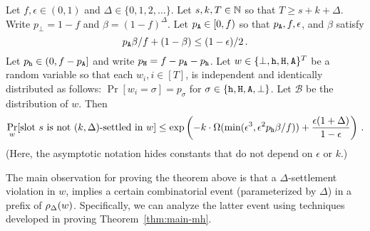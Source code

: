

    \begin{theorem}\label{thm:main-mh-async}
      Let $f, \epsilon \in (0,1)$ and $\Delta \in \{0, 1, 2, \ldots\}$. 
      Let $s, k, T \in \mathbb{N}$ so that $T \geq s + k + \Delta$. 
      Write $p_\perp = 1 - f$ and $\beta = (1 - f)^\Delta$. 
      Let $p_{\mathtt{A}} \in [0, f)$ so that $p_{\mathtt{A}}, f, \epsilon$, and $\beta$ 
      satisfy 
      \begin{equation}\label{eq:condition-prob-delta}
        p_{\mathtt{A}}  \beta/f + (1 - \beta) \leq (1 - \epsilon)/2 
        \,.
      \end{equation}      
      Let $p_{\mathtt{h}} \in (0, f - p_{\mathtt{A}}]$ and write $p_{\mathtt{H}} = f - p_{\mathtt{A}} - p_{\mathtt{h}}$. 
      Let $w \in \{\perp, \mathtt{h}, \mathtt{H}, \mathtt{A}\}^T$ be a random variable 
      so that each 
      $w_i, i \in [T]$, is independent and identically distributed as
      follows: $\Pr[w_i = \sigma] = p_\sigma$ for
      $\sigma \in \{\mathtt{h}, \mathtt{H}, \mathtt{A}, \perp\}$. 
      Let $\mathcal{B}$ be the distribution of $w$. 
      Then 
      $$
        \Pr_w[\text{slot $s$ is not $(k, \Delta)$-settled in $w$}]  
          \leq
        \exp\left( 
          -k\cdot \Omega(\min(\epsilon^3, \epsilon^2 p_{\mathtt{h}} \beta/f ) ) 
          + 
          \frac{\epsilon(1+\Delta)}{1 - \epsilon} 
        \right)
        \,.
      $$
      (Here, the asymptotic notation hides constants that do not depend on $\epsilon$ or $k$.)
    \end{theorem}
    
  
    The main observation for proving the theorem above is that 
    a $\Delta$-settlement violation in $w$, 
    implies a certain combinatorial event (parameterized by $\Delta$) 
    in a prefix of $\rho_\Delta(w)$. 
    Specifically, we can analyze the latter event 
    using techniques developed in proving Theorem~\ref{thm:main-mh}. 


